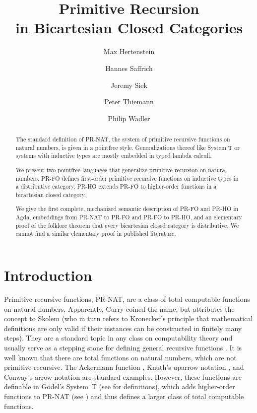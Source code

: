 \documentclass[a4paper,USenglish,cleveref, autoref, thm-restate]{lipics-v2021}
\title{Primitive Recursion \\ in Bicartesian Closed Categories} %
\author{Max Hertenstein}{University of Freiburg, Germany}{}{}{}%
\author{Hannes Saffrich}{University of Freiburg, Germany}{saffrich@informatik.uni-freiburg.de}{}{}%
\author{Jeremy Siek}{Indiana University Bloomington, USA}{jeremy.siek@gmail.com}{}{}%
\author{Peter Thiemann}{University of Freiburg, Germany}{thiemann@dacm.org}{https://orcid.org/0000-0002-9000-1239}{}%
\author{Philip Wadler}{The University of Edinburgh, United Kingdom}{wadler@inf.ed.ac.uk}{}{}
\begin{document}
\newcommand\Nat{\ensuremath{\mathbb{N}}}
\newcommand{\many}[2]{{#1}_0,\dots,{#1}_{#2-1}}
\newcommand{\xs}{\many{x}}
\newcommand{\xn}{\xs{n}}

\maketitle

\begin{abstract}
  The standard definition of PR-NAT, the system of primitive recursive functions on natural
  numbers, is given in a pointfree style. Generalizations thereof like
  System T or systems with inductive types are mostly embedded in
  typed lambda calculi.

  We present two pointfree languages that generalize primitive
  recursion on natural numbers. PR-FO defines
  first-order primitive recursive functions on inductive types in a
  distributive
  category. PR-HO extends PR-FO to higher-order functions in a
  bicartesian closed category.

  We give the first complete, mechanized semantic description of
  PR-FO and PR-HO in Agda, embeddings from PR-NAT to PR-FO and
  PR-FO to PR-HO, and an elementary proof of the folklore theorem
  that every bicartesian closed category is distributive. We cannot
  find a similar elementary proof in published literature.
\end{abstract}

\section{Introduction}
\label{sec:introduction}

Primitive recursive functions, PR-NAT, are a class of total computable
functions on natural numbers. Apparently, Curry
\cite{curry41:_formal_recur_arith} coined the name, but attributes the
concept to Skolem \cite{skolem23} (who in turn refers to Kronecker's
principle that mathematical definitions are only valid if their
instances can be constructed in finitely many steps).
They are a standard topic in any class on computability theory and
usually serve as a stepping stone for defining general recursive functions
\cite{kleene36:_gener_recur_funct_natur_number}.
It is well known that there are total functions on natural
numbers, which are not primitive recursive. The
Ackermann function \cite{szasz1991machine}, Knuth's uparrow
notation \cite{knuth76:_mathem_comput_scien}, and Conway's arrow
notation \cite{conway96:_book_number} are standard examples. However,
these functions are definable in G\"odel's System~T \cite{goedel58} (see
\cite{DBLP:journals/corr/Widemann16} for definitions), which adds higher-order functions to PR-NAT (see
\cite[Chapter 9]{DBLP:books/cu/Ha2016}) and thus defines a larger
class of total computable functions.
\end{document}
